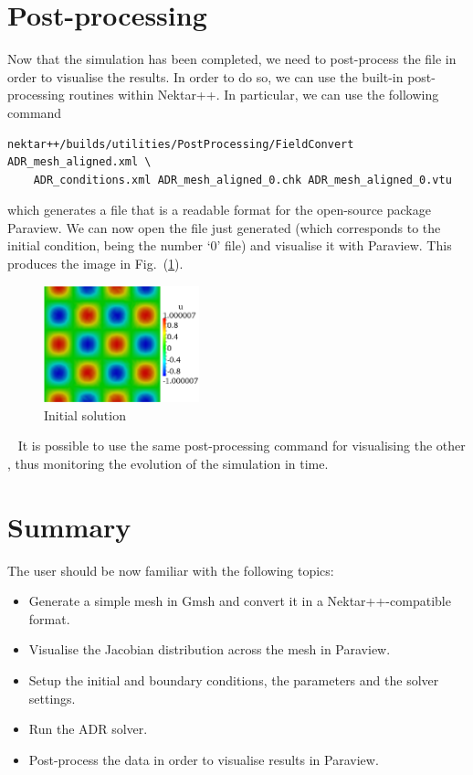 \section{Post-processing}
\label{adr-post}
Now that the simulation has been completed, we need to post-process the file in order to visualise 
the results. In order to do so, we can use the built-in post-processing routines within Nektar++.
In particular, we can use the following command
%
\begin{lstlisting}[style=BashInputStyle]
nektar++/builds/utilities/PostProcessing/FieldConvert ADR_mesh_aligned.xml \
    ADR_conditions.xml ADR_mesh_aligned_0.chk ADR_mesh_aligned_0.vtu
\end{lstlisting}
%
which generates a  file that is a readable format for the open-source package Paraview.
We can now open the \inltt{.vtu} file just generated (which corresponds to the initial condition, being 
the number `0' \inltt{.chk} file) and visualise it with Paraview. This produces the image in Fig.~(\ref{f:IC}).
%
\begin{figure}[h!]
\centering
\includegraphics[width=0.4\textwidth]{Figures/ADR_mesh_IC}
\caption{Initial solution}
\label{f:IC}
\end{figure}~
%
It is possible to use the same post-processing command for visualising the other , 
thus monitoring the evolution of the simulation in time.  


\section{Summary}
The user should be now familiar with the following topics:
\vspace{-0.5cm}
\begin{itemize}
\item Generate a simple mesh in Gmsh and convert it in a Nektar++-compatible format.
\item Visualise the Jacobian distribution across the mesh in Paraview.
\item Setup the initial and boundary conditions, the parameters and the solver settings.
\item Run the ADR solver.
\item Post-process the data in order to visualise results in Paraview.
\end{itemize}


